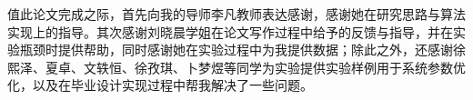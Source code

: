 %
%
%
%
%
%

\begin{acknowledgements}
  {值此论文完成之际，首先向我的导师李凡教师表达感谢，感谢她在研究思路与算法实现上的指导。其次感谢刘晓晨学姐在论文写作过程中给予的反馈与指导，并在实验瓶颈时提供帮助，同时感谢她在实验过程中为我提供数据；除此之外，还感谢徐熙泽、夏卓、文轶恒、徐孜琪、卜梦煜等同学为实验提供实验样例用于系统参数优化，以及在毕业设计实现过程中帮我解决了一些问题。}
\end{acknowledgements}

